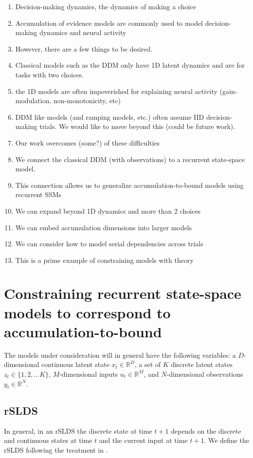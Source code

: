 \documentclass{article}
\begin{document}
\begin{enumerate}
\item Decision-making dynamics, the dynamics of making a choice
\item Accumulation of evidence models are commonly used to model decision-making dynamics and neural activity
\item However, there are a few things to be desired.
\item Classical models such as the DDM only have 1D latent dynamics and are for tasks with two choices. 
\item the 1D models are often impoverished for explaining neural activity (gain-modulation, non-monotonicity, etc)
\item DDM like models (and ramping models, etc.) often assume IID decision-making trials. We would like to move beyond this (could be future work).
\item Our work overcomes (some?) of these difficulties 
\item We connect the classical DDM (with observations) to a recurrent state-space model. 
\item This connection allows us to generalize accumulation-to-bound models using recurrent SSMs
\item We can expand beyond 1D dynamics and more than 2 choices
\item We can embed accumulation dimensions into larger models
\item We can consider how to model serial dependencies across trials 
\item This is a prime example of constraining models with theory \cite{linderman2017using}
\end{enumerate}

\section{Constraining recurrent state-space models to correspond to accumulation-to-bound}

The models under consideration will in general have the following variables: a $D$-dimensional continuous latent state $x_t \in \mathbb{R}^D$, a set of $K$ discrete latent states $z_t \in \{ 1, 2, ... K \}$, $M$-dimensional inputs $u_t \in \mathbb{R}^M$, and $N$-dimensional observations $y_t \in \mathbb{R}^N$. 

\subsection{rSLDS}
In general, in an rSLDS the discrete state at time $t+1$ depends on the discrete and continuous states at time $t$ and the current input at time $t+1$. We define the rSLDS following the treatment in \cite{linderman2017bayesian}.
\end{document}
